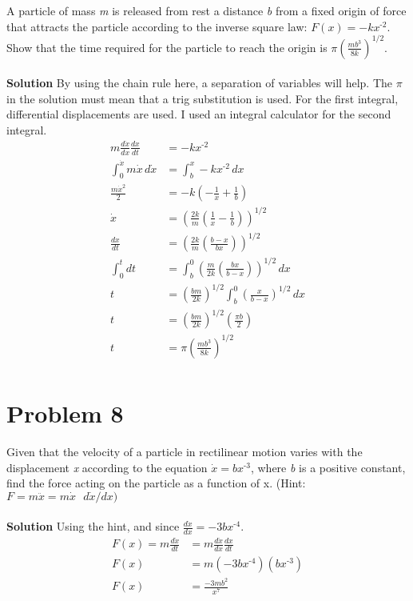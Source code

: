 \documentclass[]{article}
\newcommand{\bd}{\textbf}
\begin{document}
A particle of mass \textit{m} is released from rest a distance \textit{b} from a fixed origin of force that attracts the particle according to the inverse square law: $ F(x) = -kx^\text{-2} $. Show that the time required for the particle to reach the origin is $ \pi (\frac{mb^3}{8k})^\text{1/2} $.
\\\\
\bd{Solution} By using the chain rule here, a separation of variables will help. The $\pi$ in the solution must mean that a trig substitution is used. For the first integral, differential displacements are used. I used an integral calculator for the second integral.
\begin{equation}
	\begin{split}
		m \frac{d\dot{x}}{dx} \frac{dx}{dt} &= -kx^\text{-2} \\
		\int_{0}^{\dot{x}} m\dot{x} \, d\dot{x} &= \int_{b}^{x} -kx^\text{-2} \, dx \\
		\frac{m\dot{x}^2}{2} &= -k\left( -\frac{1}{x} + \frac{1}{b} \right) \\
		\dot{x} &= \left( \frac{2k}{m} \left( \frac{1}{x} - \frac{1}{b} \right) \right)^\text{1/2} \\
		\frac{dx}{dt} &= \left( \frac{2k}{m} \left( \frac{b-x}{bx} \right) \right)^\text{1/2} \\
		\int_{0}^{t} dt &= \int_{b}^{0} \left( \frac{m}{2k} \left( \frac{bx}{b - x} \right) \right)^\text{1/2} \, dx \\
		t &= \left( \frac{bm}{2k}\right)^\text{1/2} \int_{b}^{0} \left( \frac{x}{b - x} \right)^\text{1/2} \, dx \\
		t &= \left( \frac{bm}{2k}\right)^\text{1/2} \left( \frac{\pi b}{2} \right) \\
		t &= \pi \left( \frac{mb^3}{8k}\right)^\text{1/2} \\
	\end{split}
\end{equation}

\clearpage

\section{Problem 8}

Given that the velocity of a particle in rectilinear motion varies with the displacement \textit{x} according to the equation $ \dot{x} = bx^\text{-3} $, where \textit{b} is a positive constant, find the force acting on the particle as a function of x. (Hint: $ F = m\ddot{x} = m\dot{x} \text{ } d\dot{x}/dx) $
\\\\
\bd{Solution} Using the hint, and since $ \frac{d\dot{x}}{dx} = -3bx^\text{-4} $. 
\begin{equation}
	\begin{split}
		F(x) = m \frac{d\dot{x}}{dt} &= m \frac{d\dot{x}}{dx} \frac{dx}{dt} \\
		F(x) &= m(-3bx^\text{-4})(bx^\text{-3}) \\
		F(x) &= \frac{-3mb^2}{x^7} \\
	\end{split}
\end{equation}
\end{document}
